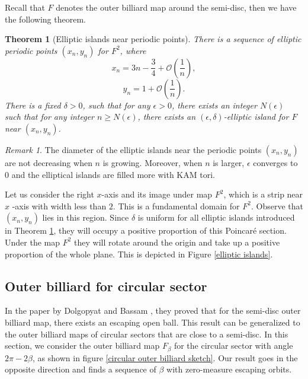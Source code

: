 \documentclass{article}
\numberwithin{figure}{section}
\numberwithin{equation}{section}
\newtheorem{theorem}{Theorem}
\theoremstyle{remark}
\newtheorem*{remark}{Remark}
\theoremstyle{definition}
\begin{document}
Recall that $F$ denotes the outer billiard map around the semi-disc, then we have the following theorem.
\begin{theorem} [Elliptic islands near periodic points]\label{Elliptic islands near fixed points}
There is a sequence of elliptic periodic points $\left(x_n,y_n\right)$ for $F^2$, where
\[x_{n} = 3n - \frac{3}{4}+\mathcal{O}\left( \frac{1}{n} \right),\]
\[y_{n} = 1 + \mathcal{O}\left( \frac{1}{n} \right).\]
There is a fixed $\delta>0$, such that for any $\epsilon>0$, there exists an integer $N(\epsilon)$ such that for any integer $n \geq N(\epsilon)$, there exists an $(\epsilon,\delta)$-elliptic island for $F$ near $\left( x_{n},y_{n} \right)$.

\end{theorem}


\begin{remark}
	The diameter of the elliptic islands near the periodic points $\left( x_{n},y_{n} \right)$ are not decreasing when $n$ is growing.  Moreover, when $n$ is larger, $\epsilon$ converges to $0$ and the elliptical islands are filled more with KAM tori. 
	
	Let us consider the right $x$-axis and its image under map $F^2$, which is a strip near $x$ -axis with width less than $2$. This is a {\color{red}fundamental domain} for $F^2$. Observe that $\left( x_{n},y_{n} \right)$ lies in this region. Since $\delta$ is uniform for all elliptic islands introduced in Theorem \ref{Elliptic islands near fixed points}, 
	they will occupy a positive proportion of this Poincar\'{e} section. Under the map $F^2$ they will rotate around the origin and take up a positive proportion of the whole plane. This is depicted in Figure \ref{elliptic islands}.
\end{remark}
\subsection{Outer billiard for circular sector}
In the paper by Dolgopyat and Bassam \cite{dolgopyat_unbounded_2009}, they proved that for the semi-disc outer billiard map, there exists an escaping open ball. This result can be generalized to the outer billiard maps of circular sectors that are close to a semi-disc. In this section, we consider the outer billiard map $F_\beta$ for the circular sector with angle $2\pi-2\beta$, as shown in figure \ref{circular outer billiard sketch}. Our result goes in the opposite direction and finds a sequence of $\beta$ with zero-measure escaping orbits.
\end{document}
